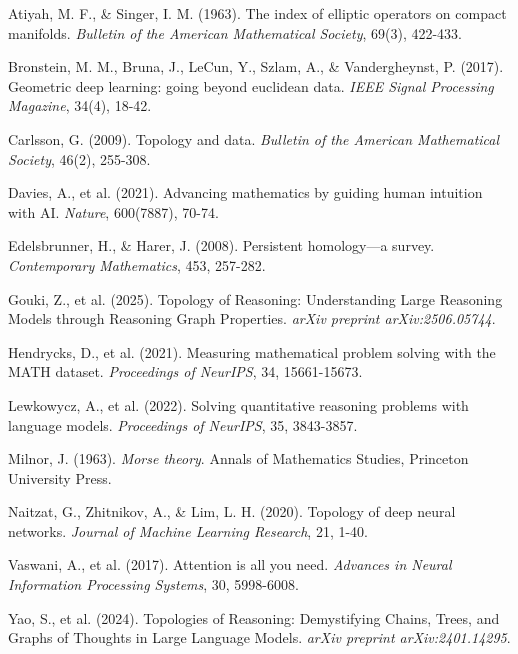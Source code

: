 \documentclass[11pt,a4paper]{article}
\begin{document}
\begin{thebibliography}{99}

Atiyah, M. F., \& Singer, I. M. (1963). The index of elliptic operators on compact manifolds. \textit{Bulletin of the American Mathematical Society}, 69(3), 422-433.

Bronstein, M. M., Bruna, J., LeCun, Y., Szlam, A., \& Vandergheynst, P. (2017). Geometric deep learning: going beyond euclidean data. \textit{IEEE Signal Processing Magazine}, 34(4), 18-42.

Carlsson, G. (2009). Topology and data. \textit{Bulletin of the American Mathematical Society}, 46(2), 255-308.

Davies, A., et al. (2021). Advancing mathematics by guiding human intuition with AI. \textit{Nature}, 600(7887), 70-74.

Edelsbrunner, H., \& Harer, J. (2008). Persistent homology—a survey. \textit{Contemporary Mathematics}, 453, 257-282.

Gouki, Z., et al. (2025). Topology of Reasoning: Understanding Large Reasoning Models through Reasoning Graph Properties. \textit{arXiv preprint arXiv:2506.05744}.

Hendrycks, D., et al. (2021). Measuring mathematical problem solving with the MATH dataset. \textit{Proceedings of NeurIPS}, 34, 15661-15673.

Lewkowycz, A., et al. (2022). Solving quantitative reasoning problems with language models. \textit{Proceedings of NeurIPS}, 35, 3843-3857.

Milnor, J. (1963). \textit{Morse theory}. Annals of Mathematics Studies, Princeton University Press.

Naitzat, G., Zhitnikov, A., \& Lim, L. H. (2020). Topology of deep neural networks. \textit{Journal of Machine Learning Research}, 21, 1-40.

Vaswani, A., et al. (2017). Attention is all you need. \textit{Advances in Neural Information Processing Systems}, 30, 5998-6008.

Yao, S., et al. (2024). Topologies of Reasoning: Demystifying Chains, Trees, and Graphs of Thoughts in Large Language Models. \textit{arXiv preprint arXiv:2401.14295}.

\end{thebibliography}
\end{document}
